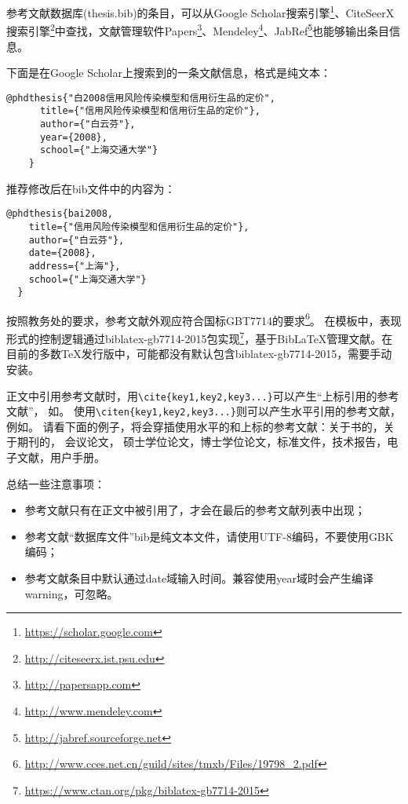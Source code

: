 参考文献数据库(thesis.bib)的条目，可以从Google Scholar搜索引擎\footnote{\url{https://scholar.google.com}}、CiteSeerX搜索引擎\footnote{\url{http://citeseerx.ist.psu.edu}}中查找，文献管理软件Papers\footnote{\url{http://papersapp.com}}、Mendeley\footnote{\url{http://www.mendeley.com}}、JabRef\footnote{\url{http://jabref.sourceforge.net}}也能够输出条目信息。

下面是在Google Scholar上搜索到的一条文献信息，格式是纯文本：

\begin{lstlisting}[caption={从Google Scholar找到的参考文献条目}, label=googlescholar, escapeinside="", numbers=none]
    @phdthesis{"白2008信用风险传染模型和信用衍生品的定价",
      title={"信用风险传染模型和信用衍生品的定价"},
      author={"白云芬"},
      year={2008},
      school={"上海交通大学"}
    } 
\end{lstlisting}

推荐修改后在bib文件中的内容为：

\begin{lstlisting}[caption={修改后的参考文献条目}, label=itemok, escapeinside="", numbers=none]
  @phdthesis{bai2008,
    title={"信用风险传染模型和信用衍生品的定价"},
    author={"白云芬"},
    date={2008},
    address={"上海"},
    school={"上海交通大学"}
  } 
\end{lstlisting}

按照教务处的要求，参考文献外观应符合国标GBT7714的要求\footnote{\url{http://www.cces.net.cn/guild/sites/tmxb/Files/19798_2.pdf}}。
在模板中，表现形式的控制逻辑通过bibla­tex-gb7714-2015包实现\footnote{\url{https://www.ctan.org/pkg/biblatex-gb7714-2015}}，基于{Bib\LaTeX}管理文献。在目前的多数TeX发行版中，可能都没有默认包含biblatex-gb7714-2015，需要手动安装。

正文中引用参考文献时，用\verb+\cite{key1,key2,key3...}+可以产生“上标引用的参考文献”，
如\cite{Meta_CN,chen2007act,DPMG}。
使用\verb+\citen{key1,key2,key3...}+则可以产生水平引用的参考文献，例如。
请看下面的例子，将会穿插使用水平的和上标的参考文献：关于书的，关于期刊的\cite{chen2007act,chen2007ewi}，
会议论文，
硕士学位论文，博士学位论文\cite{shaheshang,FistSystem01,bai2008}，标准文件，技术报告\cite{NPB2}，电子文献，用户手册。

总结一些注意事项：
\begin{itemize}
\item 参考文献只有在正文中被引用了，才会在最后的参考文献列表中出现；
\item 参考文献“数据库文件”bib是纯文本文件，请使用UTF-8编码，不要使用GBK编码；
\item 参考文献条目中默认通过date域输入时间。兼容使用year域时会产生编译warning，可忽略。
\end{itemize}


